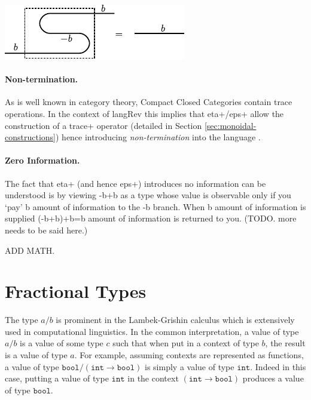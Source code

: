 \documentclass[preprint]{sigplanconf}
\begin{document}
\begin{center}
  \includegraphics{diagrams/coherence.pdf}
\end{center}

\paragraph*{Non-termination.}
As is well known in category theory, Compact Closed Categories contain
trace operations.  In the context of {{langRev}} this implies that
{{eta+}}/{{eps+}} allow the construction of a {{trace+}} operator
(detailed in Section \ref{sec:monoidal-constructions}) hence
introducing \emph{non-termination} into the language
\cite{infeffects}.

\paragraph*{Zero Information.}
The fact that {{eta+}} (and hence {{eps+}}) introduces no information
can be understood is by viewing {{-b+b}} as a type whose value is
observable only if you `pay' {{b}} amount of information to the {{-b}}
branch. When {{b}} amount of information is supplied {{(-b+b)+b=b}}
amount of information is returned to you. (TODO. more needs to be said
here.)

ADD MATH. 

\section{Fractional Types}
\label{sec:frac}

The type $a/b$ is prominent in the Lambek-Grishin calculus which is
extensively used in computational linguistics. In the common interpretation,
a value of type $a/b$ is a value of some type $c$ such that when put in a
context of type $b$, the result is a value of type $a$. For example, assuming
contexts are represented as functions, a value of type $\texttt{bool} /
(\texttt{int} \rightarrow \texttt{bool})$ is simply a value of type
$\texttt{int}$. Indeed in this case, putting a value of type $\texttt{int}$
in the context $(\texttt{int} \rightarrow \texttt{bool})$ produces a value of
type $\texttt{bool}$. 
\end{document}
